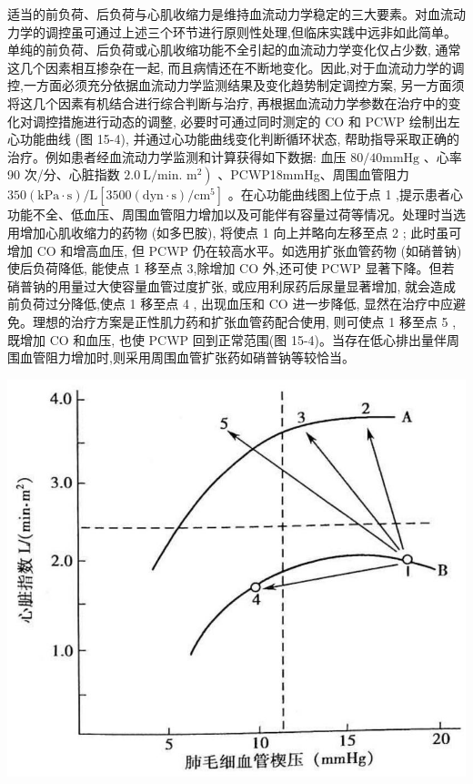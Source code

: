 \documentclass[10pt]{article}
\begin{document}
适当的前负荷、后负荷与心肌收缩力是维持血流动力学稳定的三大要素。对血流动力学的调控虽可通过上述三个环节进行原则性处理,但临床实践中远非如此简单。单纯的前负荷、后负荷或心肌收缩功能不全引起的血流动力学变化仅占少数, 通常这几个因素相互掺杂在一起, 而且病情还在不断地变化。因此,对于血流动力学的调控,一方面必须充分依据血流动力学监测结果及变化趋势制定调控方案, 另一方面须将这几个因素有机结合进行综合判断与治疗, 再根据血流动力学参数在治疗中的变化对调控措施进行动态的调整, 必要时可通过同时测定的 CO 和 PCWP 绘制出左心功能曲线 (图 15-4), 并通过心功能曲线变化判断循环状态, 帮助指导采取正确的治疗。例如患者经血流动力学监测和计算获得如下数据: 血压 $80 / 40 \mathrm{mmHg}$ 、心率 90 次/分、心脏指数 $2.0 \mathrm{~L} / \mathrm{min}$. $\left.\mathrm{m}^{2}\right)$ 、PCWP18mmHg、周围血管阻力 $350(\mathrm{kPa} \cdot \mathrm{s}) / \mathrm{L}\left[3500(\mathrm{dyn} \cdot \mathrm{s}) / \mathrm{cm}^{5}\right]$ 。在心功能曲线图上位于点 1 ,提示患者心功能不全、低血压、周围血管阻力增加以及可能伴有容量过荷等情况。处理时当选用增加心肌收缩力的药物 (如多巴胺), 将使点 1 向上并略向左移至点 2 ; 此时虽可增加 CO 和增高血压, 但 PCWP 仍在较高水平。如选用扩张血管药物 (如硝普钠) 使后负荷降低, 能使点 1 移至点 3,除增加 CO 外,还可使 PCWP 显著下降。但若硝普钠的用量过大使容量血管过度扩张, 或应用利尿药后尿量显著增加, 就会造成前负荷过分降低,使点 1 移至点 4 , 出现血压和 CO 进一步降低, 显然在治疗中应避免。理想的治疗方案是正性肌力药和扩张血管药配合使用, 则可使点 1 移至点 5 ,既增加 CO 和血压, 也使 PCWP 回到正常范围(图 15-4)。当存在低心排出量伴周围血管阻力增加时,则采用周围血管扩张药如硝普钠等较恰当。

\begin{center}
\includegraphics[max width=\textwidth]{2024_07_09_002a177993bd97d1d6d7g-167}
\end{center}
\end{document}
